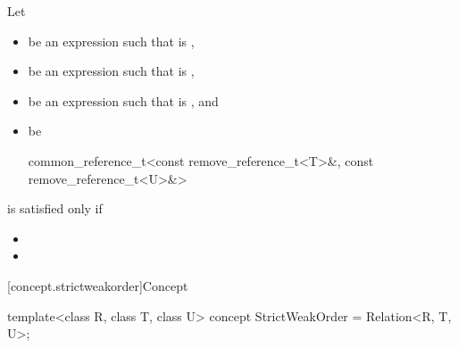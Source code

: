 \begin{itemdescr}
\pnum
Let
\begin{itemize}
\item {} be an expression such that  is ,
\item {} be an expression such that  is ,
\item {} be an expression such that  is ,
  and
\item {} be
  \begin{codeblock}
  common_reference_t<const remove_reference_t<T>&,
                     const remove_reference_t<U>&>
  \end{codeblock}
\end{itemize}
 is satisfied only if

\begin{itemize}
\item {}
\item {}
\end{itemize}
\end{itemdescr}

[concept.strictweakorder]{Concept }

%
\begin{itemdecl}
template<class R, class T, class U>
  concept StrictWeakOrder = Relation<R, T, U>;
\end{itemdecl}

